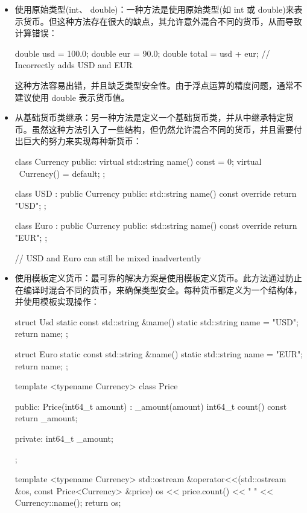 \begin{itemize}
\item
使用原始类型(int、 double)：一种方法是使用原始类型(如 int 或 double)来表示货币。但这种方法存在很大的缺点，其允许意外混合不同的货币，从而导致计算错误：

\begin{cpp}
double usd = 100.0;
double eur = 90.0;
double total = usd + eur; // Incorrectly adds USD and EUR
\end{cpp}

这种方法容易出错，并且缺乏类型安全性。由于浮点运算的精度问题，通常不建议使用 double 表示货币值。

\item
从基础货币类继承：另一种方法是定义一个基础货币类，并从中继承特定货币。虽然这种方法引入了一些结构，但仍然允许混合不同的货币，并且需要付出巨大的努力来实现每种新货币：

\begin{cpp}
class Currency {
public:
    virtual std::string name() const = 0;
    virtual ~Currency() = default;
};

class USD : public Currency {
public:
    std::string name() const override { return "USD"; }
};

class Euro : public Currency {
public:
    std::string name() const override { return "EUR"; }
};

// USD and Euro can still be mixed inadvertently
\end{cpp}

\item
使用模板定义货币：最可靠的解决方案是使用模板定义货币。此方法通过防止在编译时混合不同的货币，来确保类型安全。每种货币都定义为一个结构体，并使用模板实现操作：

\begin{cpp}
struct Usd {
    static const std::string &name() {
        static std::string name = "USD";
        return name;
    }
};

struct Euro {
    static const std::string &name() {
        static std::string name = "EUR";
        return name;
    }
};

template <typename Currency>
class Price {
public:
    Price(int64_t amount) : _amount(amount) {}
    int64_t count() const { return _amount; }

private:
    int64_t _amount;
};

template <typename Currency>
std::ostream &operator<<(std::ostream &os, const Price<Currency> &price) {
    os << price.count() << " " << Currency::name();
    return os;
}


\end{cpp}
\end{itemize}
